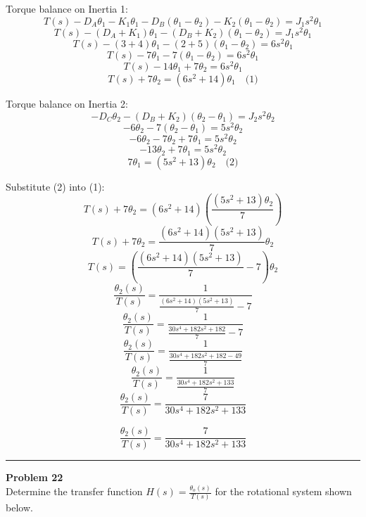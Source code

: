 Torque balance on Inertia 1:
\[
T(s) - D_A \theta_1 - K_1 \theta_1 - D_B (\theta_1 - \theta_2) - K_2 (\theta_1 - \theta_2) = J_1 s^2 \theta_1
\]
\[
T(s) - (D_A + K_1)\theta_1 - (D_B + K_2)(\theta_1 - \theta_2) = J_1 s^2 \theta_1
\]
\[
T(s) - (3 + 4)\theta_1 - (2 + 5)(\theta_1 - \theta_2) = 6s^2 \theta_1
\]
\[
T(s) - 7\theta_1 - 7(\theta_1 - \theta_2) = 6s^2 \theta_1
\]
\[
T(s) - 14\theta_1 + 7\theta_2 = 6s^2 \theta_1
\]
\[
T(s) + 7\theta_2 = (6s^2 + 14)\theta_1 \quad \text{(1)}
\]

Torque balance on Inertia 2:
\[
- D_C \theta_2 - (D_B + K_2)(\theta_2 - \theta_1) = J_2 s^2 \theta_2
\]
\[
- 6\theta_2 - 7(\theta_2 - \theta_1) = 5s^2 \theta_2
\]
\[
- 6\theta_2 - 7\theta_2 + 7\theta_1 = 5s^2 \theta_2
\]
\[
-13\theta_2 + 7\theta_1 = 5s^2 \theta_2
\]
\[
7\theta_1 = (5s^2 + 13)\theta_2 \quad \text{(2)}
\]

Substitute (2) into (1):
\[
T(s) + 7\theta_2 = (6s^2 + 14)\left( \frac{(5s^2 + 13)\theta_2}{7} \right)
\]
\[
T(s) + 7\theta_2 = \frac{(6s^2 + 14)(5s^2 + 13)}{7} \theta_2
\]
\[
T(s) = \left( \frac{(6s^2 + 14)(5s^2 + 13)}{7} - 7 \right) \theta_2
\]
\[
\frac{\theta_2(s)}{T(s)} = \frac{1}{\frac{(6s^2 + 14)(5s^2 + 13)}{7} - 7}
\]
\[
\frac{\theta_2(s)}{T(s)} = \frac{1}{\frac{30s^4 + 182s^2 + 182}{7} - 7}
\]
\[
\frac{\theta_2(s)}{T(s)} = \frac{1}{\frac{30s^4 + 182s^2 + 182 - 49}{7}}
\]
\[
\frac{\theta_2(s)}{T(s)} = \frac{1}{\frac{30s^4 + 182s^2 + 133}{7}}
\]
\[
\frac{\theta_2(s)}{T(s)} = \frac{7}{30s^4 + 182s^2 + 133}
\]

\[
\boxed{\frac{\theta_2(s)}{T(s)} = \frac{7}{30s^4 + 182s^2 + 133}}
\]

\newpage

\noindent\rule{\textwidth}{1pt}
\noindent\textbf{Problem 22} \hfill
\\ Determine the transfer function \(H(s) = \frac{\theta_o(s)}{T(s)}\) for the rotational system shown below.

